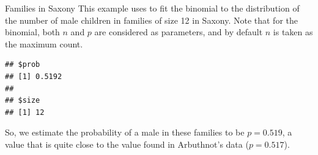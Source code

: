 \documentclass[11pt]{book}
\renewenvironment{knitrout}{\small\renewcommand{\baselinestretch}{.85}}{} %
\begin{document}
\begin{Example}[saxfit]{Families in Saxony}
This example uses  to fit the binomial 
to the distribution of the number of male children in families
of size 12 in Saxony.  Note that for the binomial, both $n$ and $p$
are considered as parameters, and by default $n$ is taken as the maximum count.
\begin{knitrout}
\color{fgcolor}\begin{kframe}
\begin{alltt}
 \hlstd{=}\hlstd{)}
 \hlkwb{<-}  \hlstd{=}\hlstd{)}
\hlopt{$}        
\end{alltt}
\begin{verbatim}
## $prob
## [1] 0.5192
## 
## $size
## [1] 12
\end{verbatim}
\end{kframe}
\end{knitrout}
So, we estimate the probability of a male in these families to be $p=0.519$,
a value that is quite close to the value found in Arbuthnot's data
($p=0.517$).


\end{Example}
\end{document}
